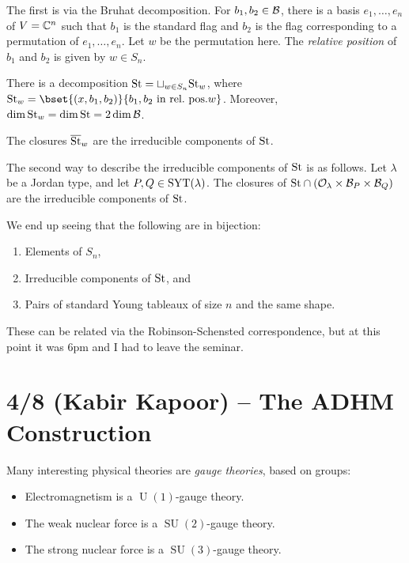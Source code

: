 \documentclass{article}
\begin{document}
The first is via the Bruhat decomposition.
For $b_1, b_2 \in \mathcal{B}$, there is a basis $e_1, \dots, e_n$ of $V = \mathbb{C}^n$ such that $b_1$ is the standard flag and $b_2$ is the flag corresponding to a permutation of $e_1, \dots, e_n$.
Let $w$ be the permutation here.
The \emph{relative position} of $b_1$ and $b_2$ is given by $w \in S_n$.

\begin{thm}
	There is a decomposition $\mathrm{St} = \sqcup_{w \in S_n} \mathrm{St}_w$, where $\St_w = \bset{(x, b_1, b_2)}{b_1, b_2 \textrm{ in rel.\ pos.} w}$.
	Moreover, $\dim \mathrm{St}_w = \dim \mathrm{St} = 2 \dim \mathcal{B}$.
\end{thm}

\begin{cor}
	The closures $\overline{\mathrm{St}}_w$ are the irreducible components of $\mathrm{St}$.
\end{cor}

The second way to describe the irreducible components of $\mathrm{St}$ is as follows.
Let $\lambda$ be a Jordan type, and let $P, Q \in \operatorname{SYT}(\lambda)$.
The closures of $\mathrm{St} \cap (\mathcal{O}_\lambda \times \mathcal{B}_P \times \mathcal{B}_Q)$ are the irreducible components of $\mathrm{St}$.

We end up seeing that the following are in bijection:
\begin{enumerate}
	\item Elements of $S_n$,
	\item Irreducible components of $\mathrm{St}$, and
	\item Pairs of standard Young tableaux of size $n$ and the same shape.
\end{enumerate}

These can be related via the Robinson-Schensted correspondence, but at this point it was 6pm and I had to leave the seminar.

\section{4/8 (Kabir Kapoor) -- The ADHM Construction}

Many interesting physical theories are \emph{gauge theories}, based on groups:

\begin{itemize}
  \item Electromagnetism is a $\mathop{U}(1)$-gauge theory.
  \item The weak nuclear force is a $\mathop{SU}(2)$-gauge theory.
  \item The strong nuclear force is a $\mathop{SU}(3)$-gauge theory.
\end{itemize}
\end{document}
